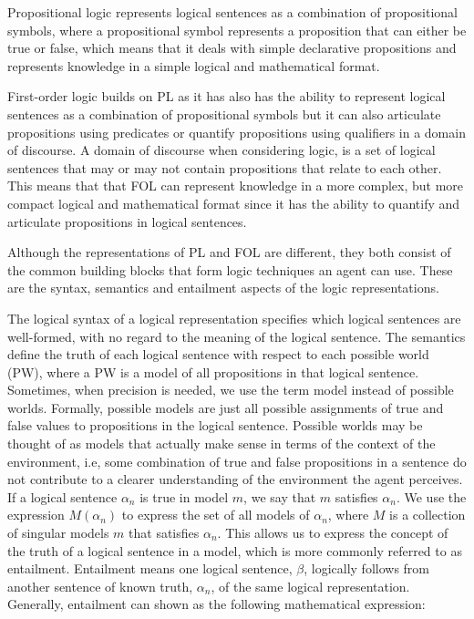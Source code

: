 Propositional logic represents logical sentences as a combination of propositional symbols, where a propositional symbol represents a proposition that can either be true or false, which means that it deals with simple declarative propositions and represents knowledge in a simple logical and mathematical format. 

First-order logic builds on PL as it has also has the ability to represent logical sentences as a combination of propositional symbols but it can also articulate propositions using predicates or quantify propositions using qualifiers in a domain of discourse. A domain of discourse when considering logic, is a set of logical sentences that may or may not contain propositions that relate to each other. This means that that FOL can represent knowledge in a more complex, but more compact logical and mathematical format since it has the ability to quantify and articulate propositions in logical sentences. 

Although the representations of PL and FOL are different, they both consist of the common building blocks that form logic techniques an agent can use. These are the syntax, semantics and entailment aspects of the logic representations.

The logical syntax of a logical representation specifies which logical sentences are well-formed, with no regard to the meaning of the logical sentence.
The semantics define the truth of each logical sentence with respect to each possible world (PW), where a PW is a model of all propositions in that logical sentence. Sometimes, when precision is needed, we use the term model instead of possible worlds. Formally, possible models are just all possible assignments of true and false values to propositions in the logical sentence. Possible worlds may be thought of as models that actually make sense in terms of the context of the environment, i.e, some combination of true and false propositions in a sentence do not contribute to a clearer understanding of the environment the agent perceives.
If a logical sentence $\alpha_n$ is true in model $m$, we say that $m$ satisfies $\alpha_n$. 
We use the expression $M(\alpha_n)$ to express the set of all models of $\alpha_n$, where $M$ is a collection of singular models $m$ that satisfies $\alpha_n$. This allows us to express the concept of the truth of a logical sentence in a model, which is more commonly referred to as entailment.  Entailment means one logical sentence, $\beta$, logically follows from another sentence of known truth,  $\alpha_n$,  of the same logical representation. Generally, entailment can shown as the following mathematical expression:

